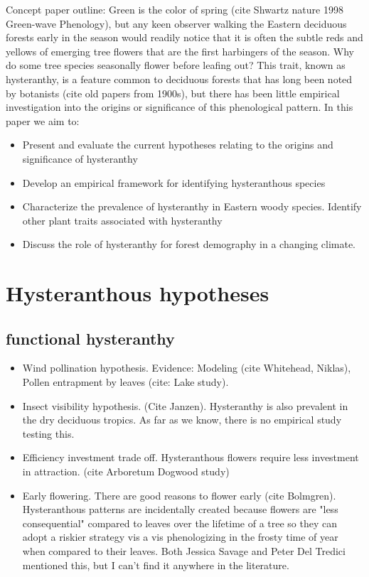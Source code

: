 \documentclass{article}\usepackage[]{graphicx}\usepackage[]{color}
\begin{document}
Concept paper outline:
Green is the color of spring (cite Shwartz nature 1998 Green-wave Phenology), but any keen observer walking the Eastern deciduous forests early in the season would readily notice that it is often the subtle reds and yellows of emerging tree flowers that are the first harbingers of the season. Why do some tree species seasonally flower before leafing out? This trait, known as hysteranthy, is a feature common to deciduous forests that has long been noted by botanists (cite old papers from 1900s), but there has been little empirical investigation into the origins or significance of this phenological pattern. In this paper we aim to:
\begin{itemize}
\item Present and evaluate the current hypotheses relating to the origins and significance of hysteranthy 
\item Develop an empirical framework for identifying hysteranthous species
\item Characterize the prevalence of hysteranthy in Eastern woody species. Identify other plant traits associated with hysteranthy
\item  Discuss the role of hysteranthy for forest demography in a changing climate.
\end{itemize}

\section*{Hysteranthous hypotheses}
\subsection {functional hysteranthy}
\begin{itemize}
\item Wind pollination hypothesis. Evidence: Modeling (cite Whitehead, Niklas), Pollen entrapment by leaves (cite: Lake study).
\item Insect visibility hypothesis. (Cite Janzen). Hysteranthy is also prevalent in the dry deciduous tropics. As far as we know, there is no empirical study testing this.
\item Efficiency investment trade off. Hysteranthous flowers require less investment in attraction. (cite Arboretum Dogwood study)
\item Early flowering. There are good reasons to flower early (cite Bolmgren). Hysteranthous patterns are incidentally created because flowers are "less consequential" compared to leaves over the lifetime of a tree so they can adopt a riskier strategy vis a vis phenologizing in the frosty time of year when compared to their leaves. Both Jessica Savage and Peter Del Tredici mentioned this, but I can't find it anywhere in the literature.
\end {itemize}
\end{document}
